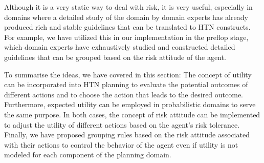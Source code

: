 Although it is a very static way to deal with risk, it is very useful, especially in domains where a detailed study of the domain by domain experts has already produced rich and stable guidelines that can be translated to HTN constructs. For example, we have utilized this in our implementation in the preflop stage, which domain experts have exhaustively studied and constructed detailed guidelines that can be grouped based on the risk attitude of the agent.


To summarise the ideas, we have covered in this section: The concept of utility can be incorporated into HTN planning to evaluate the potential outcomes of different actions and to choose the action that leads to the desired outcome. Furthermore, expected utility can be employed in probabilistic domains to serve the same purpose. In both cases, the concept of risk attitude can be implemented to adjust the utility of different actions based on the agent's risk tolerance. Finally, we have proposed grouping rules based on the risk attitude associated with their actions to control the behavior of the agent even if utility is not modeled for each component of the planning domain.